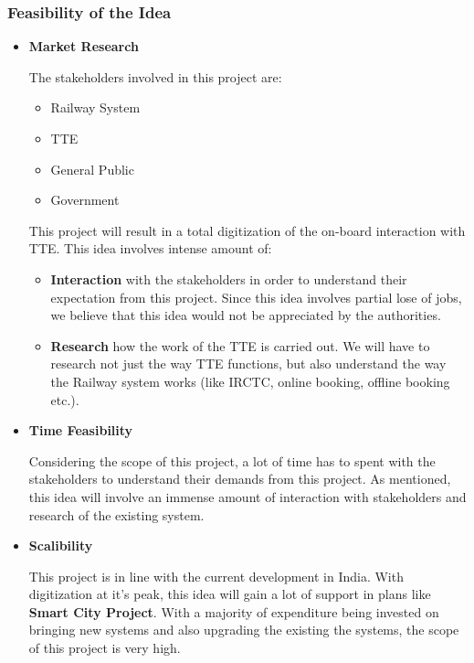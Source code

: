\documentclass{article}
\begin{document}
\subsubsection{Feasibility of the Idea}

\begin{itemize}
    \item \textbf{Market Research}
    \par The stakeholders involved in this project are:
    \begin{itemize}
        \item Railway System
        \item TTE
        \item General Public
        \item Government
    \end{itemize}
    \par This project will result in a total digitization of the on-board interaction with TTE. This idea involves intense amount of:
    \begin{itemize}
        \item \textbf{Interaction} with the stakeholders in order to understand their expectation from this project. Since this idea involves partial lose of jobs, we believe that this idea would not be appreciated by the authorities.
        \item \textbf{Research} how the work of the TTE is carried out. We will have to research not just the way TTE functions, but also understand the way the Railway system works (like IRCTC, online booking, offline booking etc.).
    \end{itemize}
    \item \textbf{Time Feasibility}
    \par Considering the scope of this project, a lot of time has to spent with the stakeholders to understand their demands from this project. As mentioned, this idea will involve an immense amount of interaction with stakeholders and research of the existing system. 
    \item \textbf{Scalibility}
    \par This project is in line with the current development in India. With digitization at it's peak, this idea will gain a lot of support in plans like \textbf{Smart City Project}. With a majority of expenditure being invested on bringing new systems and also upgrading the existing the systems, the scope of this project is very high.
    
\end{itemize}
\end{document}
